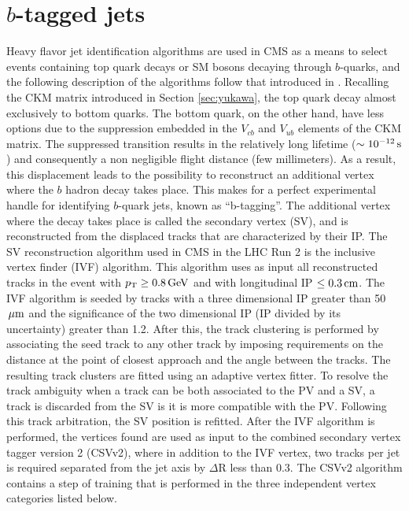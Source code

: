 \section{$b$-tagged jets}\label{sec:objectsBJets}
\noindent\justify
Heavy flavor jet identification algorithms are used in CMS as a means to select events containing top quark decays or SM bosons decaying through $b$-quarks, and the following description of the algorithms follow that introduced in \cite{Sirunyan:2017ezt}. 
Recalling the CKM matrix introduced in Section \ref{sec:yukawa}, the top quark decay almost exclusively to bottom quarks. 
The bottom quark, on the other hand, have less options due to the suppression embedded in the $V_{cb}$ and $V_{ub}$ elements of the CKM matrix. 
The suppressed transition results in the relatively long lifetime ($\sim10^{-12}\,\text{s}$) and consequently a non negligible flight distance (few millimeters). 
As a result, this displacement leads to the possibility to reconstruct an additional vertex where the $b$ hadron decay takes place. 
This makes for a perfect experimental handle for identifying $b$-quark jets, known as ``b-tagging''. 
\newpara
\noindent\justify
The additional vertex where the decay takes place is called the secondary vertex (SV), and is reconstructed from the displaced tracks that are characterized by their IP.
The SV reconstruction algorithm used in CMS in the LHC Run 2 is the inclusive vertex finder (IVF) algorithm.
This algorithm uses as input all reconstructed tracks in the event with $p_{\mathrm{T}}\geq0.8\,\text{Ge\hspace{-.08em}V}$ and with longitudinal IP $\leq0.3\,\text{cm}$. 
The IVF algorithm is seeded by tracks with a three dimensional IP greater than 50$\,\mu\text{m}$ and the significance of the two dimensional IP (IP divided by its uncertainty) greater than 1.2. 
After this, the track clustering is performed by associating the seed track to any other track by imposing requirements on the distance at the point of closest approach and the angle between the tracks. 
The resulting track clusters are fitted using an adaptive vertex fitter. 
To resolve the track ambiguity when a track can be both associated to the PV and a SV, a track is discarded from the SV is it is more compatible with the PV. 
Following this track arbitration, the SV position is refitted. 
After the IVF algorithm is performed, the vertices found are used as input to the combined secondary vertex tagger version 2 (CSVv2), where in addition to the IVF vertex, two tracks per jet is required separated from the jet axis by $\Delta$R less than 0.3. 
\newpara
\noindent\justify
The CSVv2 algorithm contains a step of training that is performed in the three independent vertex categories listed below.
